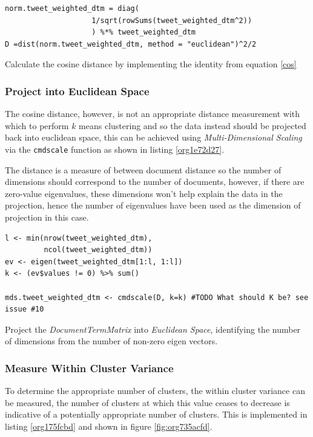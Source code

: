 \documentclass[11pt]{article}
\begin{document}
\begin{listing}[htbp]
\begin{verbatim}
norm.tweet_weighted_dtm = diag(
                    1/sqrt(rowSums(tweet_weighted_dtm^2))
                    ) %*% tweet_weighted_dtm
D =dist(norm.tweet_weighted_dtm, method = "euclidean")^2/2
\end{verbatim}
\caption{\label{org9ba2285}Calculate the cosine distance by implementing the identity from equation \eqref{cos}}
\end{listing}

\subsubsection{Project into Euclidean Space}
\label{sec:org27db492}
The cosine distance, however, is not an appropriate distance measurement with
which to perform \(k\) means clustering and so the data instead should be
projected back into euclidean space, this can be achieved using
\emph{Multi-Dimensional Scaling} via the \texttt{cmdscale} function as shown in listing \ref{org1e72d27}.

The distance is a measure of between document distance so the number of
dimensions should correspond to the number of documents, however, if there are
zero-value eigenvalues, these dimensions won't help explain the data in the
projection, hence the number of eigenvalues have been used as the dimension of
projection in this case.

\begin{listing}[htbp]
\begin{verbatim}
l <- min(nrow(tweet_weighted_dtm),
         ncol(tweet_weighted_dtm))
ev <- eigen(tweet_weighted_dtm[1:l, 1:l])
k <- (ev$values != 0) %>% sum()

mds.tweet_weighted_dtm <- cmdscale(D, k=k) #TODO What should K be? see issue #10
\end{verbatim}
\caption{\label{org1e72d27}Project the \emph{DocumentTermMatrix} into \emph{Euclidean Space}, identifying the number of dimensions from the number of non-zero eigen vectors.}
\end{listing}

\subsubsection{Measure Within Cluster Variance}
\label{sec:orga637c46}
To determine the appropriate number of clusters, the within cluster
variance can be measured, the number of clusters at which this value ceases to
decrease is indicative of a potentially appropriate number of clusters. This is
implemented in listing \ref{org175fcbd} and shown in figure \ref{fig:org735acfd}.
\end{document}
